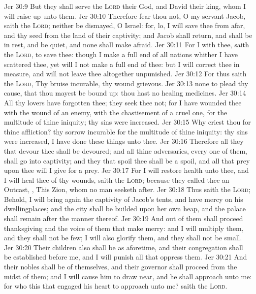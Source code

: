 \vs Jer 30:9 But they shall serve the \textsc{Lord} their God, and David their king, whom I will raise up unto them.
\vs Jer 30:10 Therefore fear thou not, O my servant Jacob, saith the \textsc{Lord}; neither be dismayed, O Israel: for, lo, I will save thee from afar, and thy seed from the land of their captivity; and Jacob shall return, and shall be in rest, and be quiet, and none shall make  afraid.
\vs Jer 30:11 For I  with thee, saith the \textsc{Lord}, to save thee: though I make a full end of all nations whither I have scattered thee, yet will I not make a full end of thee: but I will correct thee in measure, and will not leave thee altogether unpunished.
\vs Jer 30:12 For thus saith the \textsc{Lord}, Thy bruise  incurable,  thy wound  grievous.
\vs Jer 30:13  none to plead thy cause, that thou mayest be bound up: thou hast no healing medicines.
\vs Jer 30:14 All thy lovers have forgotten thee; they seek thee not; for I have wounded thee with the wound of an enemy, with the chastisement of a cruel one, for the multitude of thine iniquity;  thy sins were increased.
\vs Jer 30:15 Why criest thou for thine affliction? thy sorrow  incurable for the multitude of thine iniquity:  thy sins were increased, I have done these things unto thee.
\vs Jer 30:16 Therefore all they that devour thee shall be devoured; and all thine adversaries, every one of them, shall go into captivity; and they that spoil thee shall be a spoil, and all that prey upon thee will I give for a prey.
\vs Jer 30:17 For I will restore health unto thee, and I will heal thee of thy wounds, saith the \textsc{Lord}; because they called thee an Outcast, , This  Zion, whom no man seeketh after.
\vs Jer 30:18 Thus saith the \textsc{Lord}; Behold, I will bring again the captivity of Jacob's tents, and have mercy on his dwellingplaces; and the city shall be builded upon her own heap, and the palace shall remain after the manner thereof.
\vs Jer 30:19 And out of them shall proceed thanksgiving and the voice of them that make merry: and I will multiply them, and they shall not be few; I will also glorify them, and they shall not be small.
\vs Jer 30:20 Their children also shall be as aforetime, and their congregation shall be established before me, and I will punish all that oppress them.
\vs Jer 30:21 And their nobles shall be of themselves, and their governor shall proceed from the midst of them; and I will cause him to draw near, and he shall approach unto me: for who  this that engaged his heart to approach unto me? saith the \textsc{Lord}.
